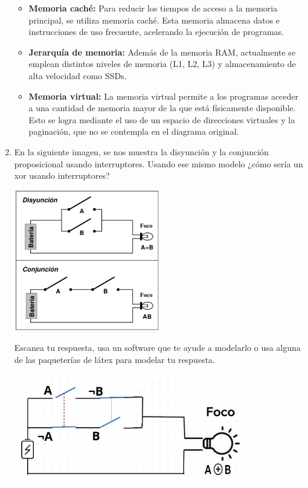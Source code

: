 \documentclass[12pt,letterpaper]{article}
\begin{document}
\begin{enumerate}
\begin{itemize}
    \item \textbf{Memoria caché:}
      Para reducir los tiempos de acceso a la memoria principal, se utiliza memoria caché. Esta memoria almacena datos e instrucciones de uso frecuente, acelerando la ejecución de programas.
      
    \item \textbf{Jerarquía de memoria:}
      Además de la memoria RAM, actualmente se emplean distintos niveles de memoria (L1, L2, L3) y almacenamiento de alta velocidad como SSDs.
      
    \item \textbf{Memoria virtual:}
      La memoria virtual permite a los programas acceder a una cantidad de memoria mayor de la que está físicamente disponible. Esto se logra mediante el uso de un espacio de direcciones virtuales y la paginación, que no se contempla en el diagrama original.
    \end{itemize}
    \bigskip
    
  \item En la siguiente imagen, se nos muestra la disyunción y la conjunción proposicional usando interruptores. Usando ese mismo modelo ¿cómo sería un xor usando interruptores?

    \begin{center}
      \includegraphics[width=0.5\textwidth]{image.png}
    \end{center}
    
    Escanea tu respuesta, usa un software que te ayude a modelarlo o usa alguna de las paqueterías de látex para modelar tu respuesta.
    
    \bigskip

    \begin{center}
      \includegraphics[width=0.8\textwidth]{image1.png}
    \end{center}
    \bigskip
\end{enumerate}
\end{document}
